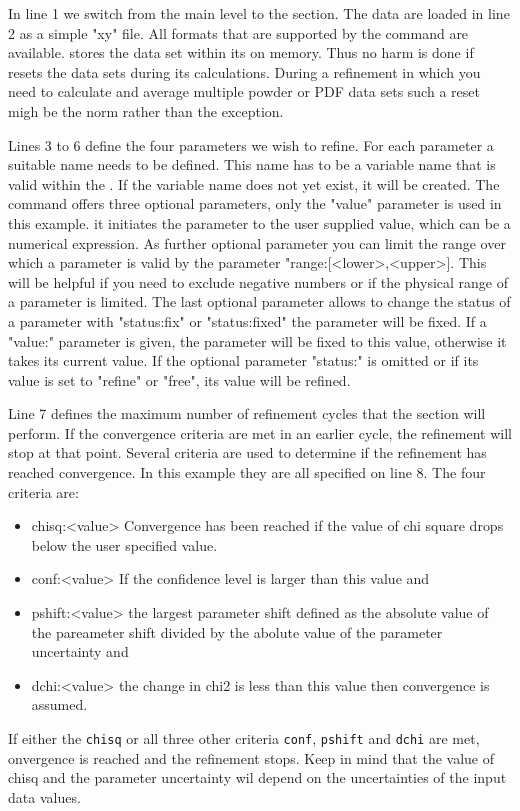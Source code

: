 In line 1 we switch from the main \Suite level to the \Refine section. 
The data are loaded in line 2 as a simple "xy" file. All formats that
are supported by the \href{./kuplot\_man.pdf} command are 
available. \Refine stores the data set within its on memory. Thus no harm
is done if \Kuplot resets the data sets during its calculations. During 
a refinement in which you need to calculate and average multiple powder or 
PDF data sets such a reset migh be the norm rather than the exception.

Lines 3 to 6 define the four parameters we wish to refine. For 
each parameter a suitable name needs to be defined. This name has to be 
a variable name that is valid within the \suite. If the variable name does
not yet exist, it will be created. The command offers three optional 
parameters, only the "value" parameter is used in this example. it initiates
the parameter to the user supplied value, which can be a numerical expression.
As further optional parameter you can limit the range over which a parameter is
valid by the parameter "range:[<lower>,<upper>]. This will be helpful if you need
to exclude negative numbers or if the physical range of a parameter is limited. 
The last optional parameter allows to change the status of a parameter with
"status:fix" or "status:fixed" the parameter will be fixed. If a "value:" 
parameter is given, the parameter will be fixed to this value, otherwise it
takes its current value. If the optional parameter "status:" is omitted or if
its value is set to "refine" or "free", its value will be refined. 

Line 7 defines the maximum number of refinement cycles that the \Refine section
will perform. If the convergence criteria are met in an earlier cycle, the 
refinement will stop at that point. Several criteria are used to determine if 
the refinement has reached convergence. In this example they are all specified 
on line 8. The four criteria are:
\begin{itemize}
  \item chisq:<value>  Convergence has been reached if the value of chi square 
        drops below the user specified value.
  \item conf:<value>  If the confidence level is larger than this value
        and
  \item pshift:<value> the largest parameter shift defined as the absolute 
        value of the pareameter shift divided by the abolute value of the 
        parameter uncertainty
        and
  \item dchi:<value> the change in chi2 is less than this value then 
        convergence is assumed.
\end{itemize}
If either the {\tt chisq} or all three other criteria {\tt conf}, 
{\tt  pshift} and {\tt dchi} are met, onvergence is reached and the 
refinement stops. Keep in mind that the value of chisq and the parameter 
uncertainty wil  depend on the uncertainties of the input data values.

